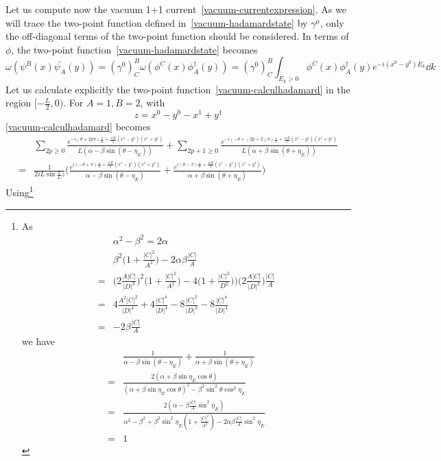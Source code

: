 Let us compute now the vacuum 1+1 current~\cref{vacuum-currentexpression}.
As we will trace the two-point function defined in~\cref{vacuum-hadamardstate} by $\gamma^\mu$, 
only the off-diagonal terms of the two-point function should be considered.
In terms of $\phi$, 
the two-point function~\cref{vacuum-hadamardstate} becomes
\begin{equation}\label{vacuum-calculhadamard}
\omega(\psi^B(x) \bar{\psi_A}(y)) = 
(\gamma^0)^B_C \omega(\phi^C(x) \phi^\dagger_A(y)) = (\gamma^0)^B_C
\int_{E_k > 0} \phi^C(x) \phi^\dagger_A(y) e^{-i(x^0 - y^0) E_k} \dd k
\end{equation}
Let us calculate explicitly the two-point function~\cref{vacuum-calculhadamard} in the region $[-\frac L 2,0)$. 
For $A =1, B= 2$, 
with 
\begin{equation*}
z =x^0 - y^0 - x^1 +y^1
\end{equation*}
\cref{vacuum-calculhadamard} becomes
\begin{equation*}
\begin{split}
& \sum_{2p \geq 0} \frac{e^{-i(\theta + 2p\pi)\frac{z}{L}+ \frac{ieE}{2}(x^1 - y^1)(x^1+y^1)} }{L(\alpha - \beta \sin (\theta - \eta_E))} 
+ \sum_{2p+1 \geq 0} \frac{e^{-i(- \theta + (2p+2)\pi)\frac{z}{L}+ \frac{ieE}{2}(x^1 - y^1)(x^1+y^1)}}{L(\alpha + \beta \sin (\theta + \eta_E))}\\
%
=& 
\frac{1}{2i L\sin\frac{\pi}{L}z} \bigg( \frac{e^{i(-\theta + \pi)\frac{z}{L}+ \frac{ieE}{2}(x^1 - y^1)(x^1+y^1)}}{\alpha - \beta \sin (\theta - \eta_E)}
+ \frac{e^{i(\theta - \pi) \frac{z}{L}+ \frac{ieE}{2}(x^1 - y^1)(x^1+y^1)}}{\alpha + \beta \sin (\theta + \eta_E)}
\bigg)
\end{split}
\end{equation*}
Using\footnote{
As
\begin{equation*}
\begin{split}
& \alpha^2 - \beta ^ 2 = 2 \alpha \\
&  \beta^2 \big(1 + \frac{|C|^2}{A^2} \big) - 2 \alpha \beta \frac{|C|}{A} \\
= & \big(2\frac{A |C|}{|D|^2} \big)^2 \big( 1+ \frac{|C|^2}{A^2} \big) - 4\big( 1+ \frac{|C|^2}{D^2}))\big(2\frac{A |C|}{|D|^2} \big) \frac{|C|}{A}  \\
= & 4 \frac{A^2 |C|^2}{|D|^4} + 4\frac{|C|^4}{|D|^4} - 8\frac{|C|^2}{|D|^2} - 8\frac{|C|^4}{|D|^4} \\
= & -2 \beta \frac{|C|}{A}
\end{split}
\end{equation*}
we have
\begin{equation*}
\begin{split}
& \frac{1}{\alpha - \beta \sin (\theta - \eta_E)}
   + \frac{1}{\alpha + \beta \sin (\theta + \eta_E)} \\
= & \frac{2(\alpha + \beta \sin \eta_E \cos \theta)}{(\alpha + \beta \sin \eta_E \cos \theta)^2 - \beta^2 \sin^2 \theta \cos^2 \eta_E} \\
= & \frac{2(\alpha - \beta \frac{|C|}{A} \sin^2 \eta_E)}{\alpha^2 - \beta^2 + \beta^2 \sin^2 \eta_E (1 + \frac{|C|^2}{A^2}) - 2 \alpha \beta \frac{|C|}{A} \sin^2 \eta_E} \\
=& 1
\end{split}
\end{equation*}
}
